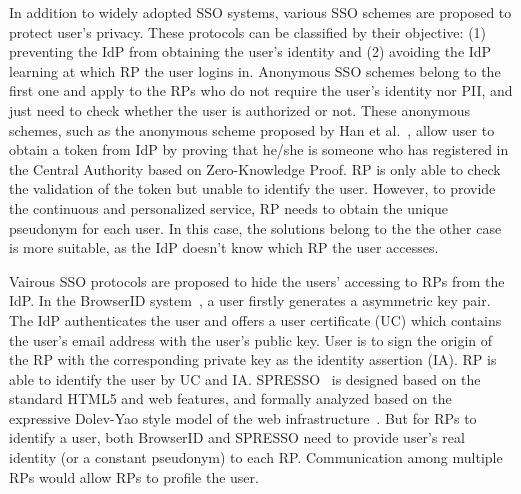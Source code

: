 In addition to widely adopted SSO systems, various SSO schemes are proposed to protect user's privacy. 
These protocols can be classified by their objective:
(1) preventing the IdP from obtaining the user's identity and (2) avoiding the IdP learning at which RP the user logins in.
Anonymous SSO schemes belong to the first one and apply to the RPs who do not require the user's identity nor PII, and just need to check whether the user is authorized or not. 
These anonymous schemes, such as the anonymous scheme proposed by Han et al.~\cite{HanCSTW18}, allow user to obtain a token from IdP by proving that he/she is someone who has registered in the Central Authority based on  Zero-Knowledge Proof. RP is only able to check the validation of the token but unable to identify the user.
However, to provide the continuous and personalized service, RP needs to obtain the unique pseudonym for each user.
In this case, the solutions belong to the the other case is more suitable, as the IdP doesn't know which RP the user accesses.

Vairous SSO protocols are proposed to hide the users' accessing to RPs from the IdP. 
In the BrowserID system~\cite{persona}, a user firstly generates a asymmetric key pair. The IdP authenticates the user and offers a user certificate (UC) which contains the user's email address with the user's public key. User is to sign the origin of the RP with the corresponding private key as the identity assertion (IA). RP is able to identify the user by UC and IA. 
SPRESSO~\cite{SPRESSO} is designed based on the standard HTML5 and web features, and formally analyzed based on the expressive Dolev-Yao style model of the web infrastructure~\cite{webmodel}. But for RPs to identify a user, both BrowserID and SPRESSO need to provide user's real identity (or a constant pseudonym) to each RP. Communication among multiple RPs would allow RPs to profile the user.  

